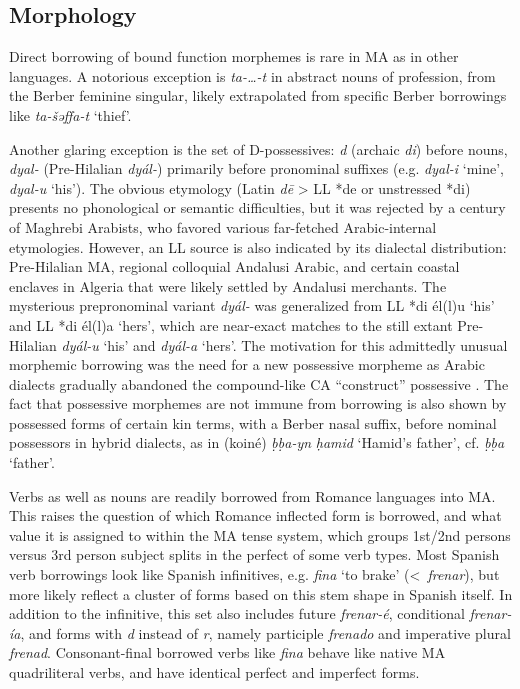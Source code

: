 \documentclass[output=paper]{langsci/langscibook}
\begin{document}
\subsection{Morphology} \label{morphol}

Direct borrowing of bound function morphemes is rare in MA as in other languages. A notorious exception is \textit{ta-…-t} in abstract nouns of profession, from the Berber feminine singular, likely extrapolated from specific Berber borrowings like \textit{ta-šəffa{\R}-t} ‘thief’. 

Another glaring exception is the set of D-possessives: \textit{d} (archaic \textit{di}) before nouns, \textit{dyal-} (Pre-Hilalian \textit{dyál-}) primarily before pronominal suffixes (e.g. \textit{dyal-i} ‘mine’, \textit{dyal-u} ‘his’). The obvious etymology (Latin \textit{dē} > LL *de or unstressed *di) presents no phonological or semantic difficulties, but it was rejected by a century of Maghrebi Arabists, who favored various far-fetched Arabic-internal etymologies. However, an LL source is also indicated by its dialectal distribution: Pre-Hilalian MA, regional colloquial Andalusi Arabic, and certain coastal enclaves in Algeria that were likely settled by Andalusi merchants. The mysterious prepronominal variant \textit{dyál-} was generalized from LL *di él(l)u ‘his’ and LL *di él(l)a ‘hers’, which are near-exact matches to the still extant Pre-Hilalian \textit{dyál-u} ‘his’ and \textit{dyál-a} ‘hers’. The motivation for this admittedly unusual morphemic borrowing was the need for a new possessive morpheme as Arabic dialects gradually abandoned the compound-like CA “construct” possessive \citep{Heath2015}. The fact that possessive morphemes are not immune from borrowing is also shown by possessed forms of certain kin terms, with a Berber nasal suffix, before nominal possessors in hybrid dialects, as in (koiné) \textit{ḅḅa-yn} \textit{ḥamid} ‘Hamid’s father’, cf. \textit{ḅḅa} ‘father’. 

Verbs as well as nouns are readily borrowed from Romance languages into MA. This raises the question of which Romance inflected form is borrowed, and what value it is assigned to within the MA tense system, which groups 1st/2nd persons versus 3rd person subject splits in the perfect of some verb types. Most Spanish verb borrowings look like Spanish infinitives, e.g. \textit{f{\R}ina{\R}} ‘to brake’ (<~\textit{frenar}), but more likely reflect a cluster of forms based on this stem shape in Spanish itself. In addition to the infinitive, this set also includes future \textit{frenar-é}, conditional \textit{frenar-ía}, and forms with \textit{d} instead of \textit{r}, namely participle \textit{frenado} and imperative plural \textit{frenad}. Consonant-final borrowed verbs like \textit{f{\R}ina{\R}} behave like native MA quadriliteral verbs, and have identical perfect and imperfect forms. 
\end{document}
